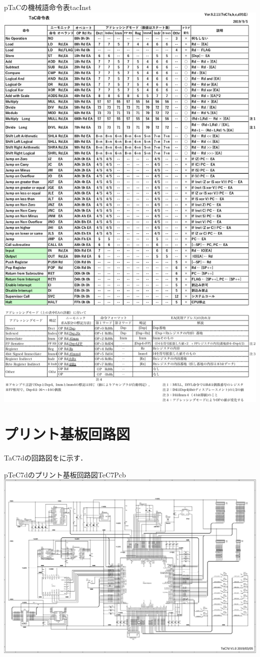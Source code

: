 \begin{myfig}{p}{TaCの機械語命令表}{tacInst}
  \includegraphics[scale=0.88,page=1]{Fig/TaCInst.pdf}
\end{myfig}

\section{プリント基板回路図}
TaC7dの回路図をに示す．

\begin{myfig}{p}{TeC7dのプリント基板回路図}{TeC7Pcb}
  \includegraphics[angle=90,scale=0.85]{Fig/TeC7dPcb.pdf}
\end{myfig}

